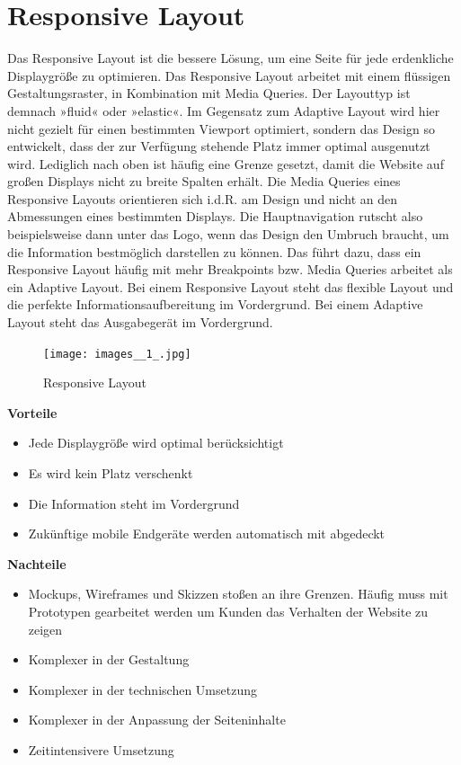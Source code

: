 \section{Responsive Layout}
Das Responsive Layout ist die bessere Lösung, um eine Seite für jede erdenkliche Displaygröße zu optimieren. Das Responsive Layout arbeitet mit einem flüssigen Gestaltungsraster, in Kombination mit Media Queries. Der Layouttyp ist demnach »fluid« oder »elastic«. Im Gegensatz zum Adaptive Layout wird hier nicht gezielt für einen bestimmten Viewport optimiert, sondern das Design so entwickelt, dass der zur Verfügung stehende Platz immer optimal ausgenutzt wird. Lediglich nach oben ist häufig eine Grenze gesetzt, damit die Website auf großen Displays nicht zu breite Spalten erhält.
Die Media Queries eines Responsive Layouts orientieren sich i.d.R. am Design und nicht an den Abmessungen eines bestimmten Displays. Die Hauptnavigation rutscht also beispielsweise dann unter das Logo, wenn das Design den Umbruch braucht, um die Information bestmöglich darstellen zu können. Das führt dazu, dass ein Responsive Layout häufig mit mehr Breakpoints bzw. Media Queries arbeitet als ein Adaptive Layout. Bei einem Responsive Layout steht das flexible Layout und die perfekte Informationsaufbereitung im Vordergrund. Bei einem Adaptive Layout steht das Ausgabegerät im Vordergrund.
\begin{figure}[!h]
  \texttt{[image: images\_\_1\_.jpg]}
  \caption{Responsive Layout}
  \label{fig:responsive layout}
\end{figure}
\newpage
\textbf{Vorteile}
\begin{itemize}
\item Jede Displaygröße wird optimal berücksichtigt
\item Es wird kein Platz verschenkt
\item Die Information steht im Vordergrund
\item Zukünftige mobile Endgeräte werden automatisch mit abgedeckt
\newline
\end{itemize}
\textbf{Nachteile}
\begin{itemize}
\item Mockups, Wireframes und Skizzen stoßen an ihre Grenzen. Häufig muss mit Prototypen gearbeitet werden um Kunden das Verhalten der Website zu zeigen
\item Komplexer in der Gestaltung
\item Komplexer in der technischen Umsetzung
\item Komplexer in der Anpassung der Seiteninhalte
\item Zeitintensivere Umsetzung
\end{itemize}


